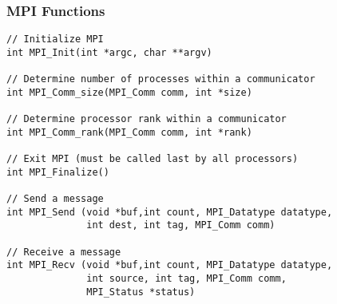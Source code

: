 \documentclass[aspectratio=43]{beamer}
\newenvironment{changemargin}[1]{%
  \begin{list}{}{%
    \setlength{\topsep}{0pt}%
    \setlength{\leftmargin}{#1}%
    \setlength{\rightmargin}{1em}
    \setlength{\listparindent}{\parindent}%
    \setlength{\itemindent}{\parindent}%
    \setlength{\parsep}{\parskip}%
  }%
  \item[]}{\end{list}}
\begin{document}
\begin{frame}[fragile]
  \frametitle{MPI Functions}
  \begin{changemargin}{1cm}

  \begin{lstlisting}
// Initialize MPI
int MPI_Init(int *argc, char **argv)

// Determine number of processes within a communicator
int MPI_Comm_size(MPI_Comm comm, int *size)

// Determine processor rank within a communicator
int MPI_Comm_rank(MPI_Comm comm, int *rank)

// Exit MPI (must be called last by all processors)
int MPI_Finalize()

// Send a message
int MPI_Send (void *buf,int count, MPI_Datatype datatype,
              int dest, int tag, MPI_Comm comm)

// Receive a message
int MPI_Recv (void *buf,int count, MPI_Datatype datatype,
              int source, int tag, MPI_Comm comm,
              MPI_Status *status)
    
  \end{lstlisting}
  \end{changemargin}
\end{frame}
\end{document}
